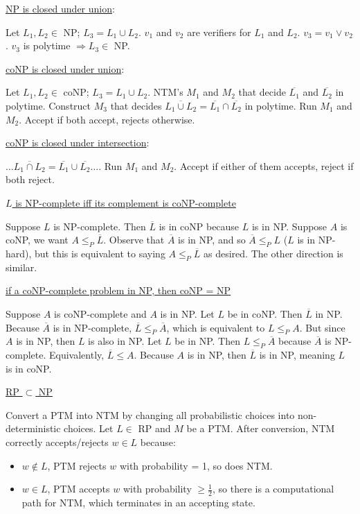 \documentclass[10pt,landscape,a4paper]{article}
\begin{document}
\begin{multicols*}{3}
\underline{NP is closed under union}:

Let $L_1, L_2 \in$ NP; $L_3 = L_1 \cup L_2$. $v_1$ and $v_2$ are verifiers for $L_1$ and $L_2$. $v_3 = v_1 \vee v_2$. $v_3$ is polytime $\Rightarrow L_3 \in$ NP.


\underline{coNP is closed under union}:

Let $L_1, L_2 \in$ coNP; $L_3 = L_1 \cup L_2$. NTM's $M_1$ and $M_2$ that decide $\overline{L_1}$ and $\overline{L_2}$ in polytime. Construct $M_3$ that decides $\overline{L_1 \cup L_2} = \overline{L_1} \cap \overline{L_2}$ in polytime. Run $M_1$ and $M_2$. Accept if both accept, rejects otherwise.

\underline{coNP is closed under intersection}:

$\ldots \overline{L_1 \cap L_2} = \overline{L_1} \cup \overline{L_2} \ldots$. Run $M_1$ and $M_2$. Accept if either of them accepts, reject if both reject.

\underline{$L$ is NP-complete iff its complement is coNP-complete}

Suppose $L$ is NP-complete. Then $\overline{L}$ is in coNP because $L$ is in NP. Suppose $A$ is coNP, we want $A \leq_P \overline{L}$. Observe that $\overline{A}$ is in NP, and so $\overline{A} \leq_P L$ ($L$ is in NP-hard), but this is equivalent to saying $A \leq_P \overline{L}$ as desired. The other direction is similar.

\underline{if a coNP-complete problem in NP, then coNP = NP}

Suppose $A$ is coNP-complete and $A$ is in NP. Let $L$ be in coNP. Then $\overline{L}$ in NP. Because $\overline{A}$ is in NP-complete, $\overline{L} \leq_P \overline{A}$, which is equivalent to $L \leq_P A$. But since $A$ is in NP, then $L$ is also in NP. Let $L$ be in NP. Then $L \leq_P \overline{A}$ because $\overline{A}$ is NP-complete. Equivalently, $\overline{L} \leq A$. Because $A$ is in NP, then $\overline{L}$ is in NP, meaning $L$ is in coNP.

\underline{RP $\subset$ NP}

Convert a PTM into NTM by changing all probabilistic choices into non-deterministic choices. Let $L \in$ RP and $M$ be a PTM. After conversion, NTM correctly accepts/rejects $w \in L$ because:

\begin{itemize}
    \item $w \notin L$, PTM rejects $w$ with probability = 1, so does NTM.
    \item $w \in L$, PTM accepts $w$ with probability $\geq \frac{1}{2}$, so there is a computational path for NTM, which terminates in an accepting state.
\end{itemize}


\end{multicols*}
\end{document}
